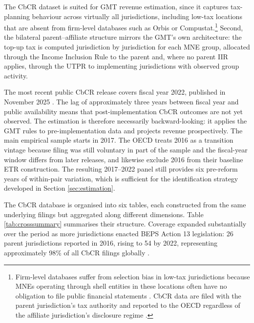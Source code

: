 \documentclass[11pt,a4paper]{article}
\begin{document}
The CbCR dataset is suited for GMT revenue estimation, since it captures tax-planning behaviour across virtually all jurisdictions, including low-tax locations that are absent from firm-level databases such as Orbis or Compustat.\footnote{Firm-level databases suffer from selection bias in low-tax jurisdictions because MNEs operating through shell entities in these locations often have no obligation to file public financial statements \citep{torslov2023}. CbCR data are filed with the parent jurisdiction's tax authority and reported to the OECD regardless of the affiliate jurisdiction's disclosure regime \citep{oecd2025a}.} Second, the bilateral parent--affiliate structure mirrors the GMT's own architecture: the top-up tax is computed jurisdiction by jurisdiction for each MNE group, allocated through the Income Inclusion Rule to the parent and, where no parent IIR applies, through the UTPR to implementing jurisdictions with observed group activity. 

The most recent public CbCR release covers fiscal year 2022, published in November 2025 \citep{oecd2025a}. The lag of approximately three years between fiscal year and public availability means that post-implementation CbCR outcomes are not yet observed. The estimation is therefore necessarily backward-looking: it applies the GMT rules to pre-implementation data and projects revenue prospectively. The main empirical sample starts in 2017. The OECD treats 2016 as a transition vintage because filing was still voluntary in part of the sample and the fiscal-year window differs from later releases, and \citet{hugger2026} likewise exclude 2016 from their baseline ETR construction. The resulting 2017--2022 panel still provides six pre-reform years of within-pair variation, which is sufficient for the identification strategy developed in Section \ref{sec:estimation}.

The CbCR database is organised into six tables, each constructed from the same underlying filings but aggregated along different dimensions. Table \ref{tab:crosssummary} summarises their structure. Coverage expanded substantially over the period as more jurisdictions enacted BEPS Action 13 legislation: 26 parent jurisdictions reported in 2016, rising to 54 by 2022, representing approximately 98\% of all CbCR filings globally \citep{oecd2025a}.
\end{document}
